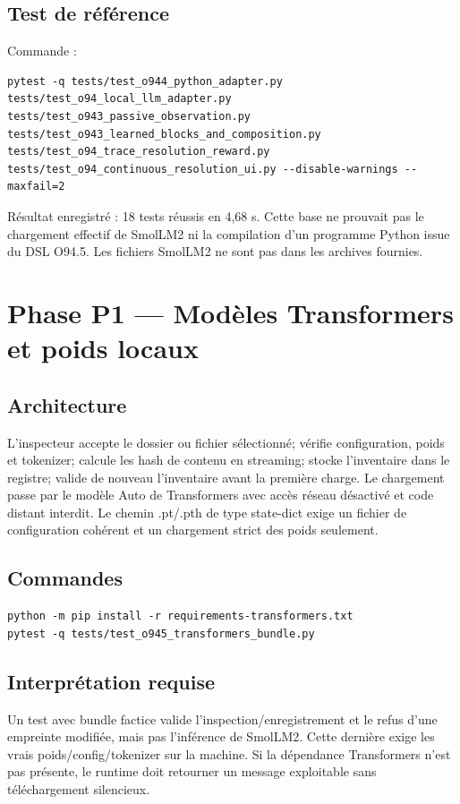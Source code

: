 \documentclass[11pt,a4paper]{article}
\begin{document}
\subsection{Test de référence}
Commande :
\begin{verbatim}
pytest -q tests/test_o944_python_adapter.py tests/test_o94_local_llm_adapter.py tests/test_o943_passive_observation.py tests/test_o943_learned_blocks_and_composition.py tests/test_o94_trace_resolution_reward.py tests/test_o94_continuous_resolution_ui.py --disable-warnings --maxfail=2
\end{verbatim}
Résultat enregistré : 18 tests réussis en 4,68 s. Cette base ne prouvait pas le chargement effectif de SmolLM2 ni la compilation d'un programme Python issue du DSL O94.5. Les fichiers SmolLM2 ne sont pas dans les archives fournies.

\section{Phase P1 — Modèles Transformers et poids locaux}
\subsection{Architecture}
L'inspecteur accepte le dossier ou fichier sélectionné; vérifie configuration, poids et tokenizer; calcule les hash de contenu en streaming; stocke l'inventaire dans le registre; valide de nouveau l'inventaire avant la première charge. Le chargement passe par le modèle Auto de Transformers avec accès réseau désactivé et code distant interdit. Le chemin .pt/.pth de type state-dict exige un fichier de configuration cohérent et un chargement strict des poids seulement.
\subsection{Commandes}
\begin{verbatim}
python -m pip install -r requirements-transformers.txt
pytest -q tests/test_o945_transformers_bundle.py
\end{verbatim}
\subsection{Interprétation requise}
Un test avec bundle factice valide l'inspection/enregistrement et le refus d'une empreinte modifiée, mais pas l'inférence de SmolLM2. Cette dernière exige les vrais poids/config/tokenizer sur la machine. Si la dépendance Transformers n'est pas présente, le runtime doit retourner un message exploitable sans téléchargement silencieux.
\end{document}
